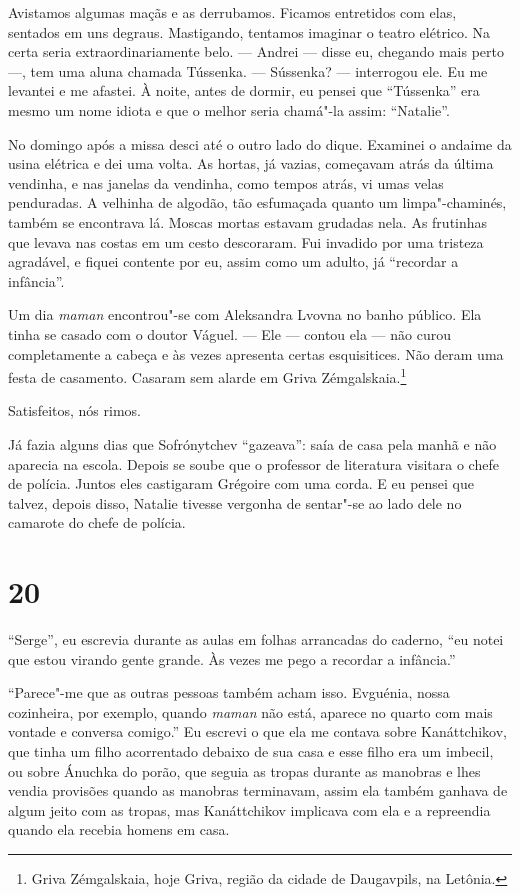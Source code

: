 Avistamos algumas maçãs e as derrubamos. Ficamos entretidos com elas,
sentados em uns degraus. Mastigando, tentamos imaginar o teatro
elétrico. Na certa seria extraordinariamente belo. --- Andrei --- disse
eu, chegando mais perto ---, tem uma aluna chamada Tússenka. ---
Sússenka? --- interrogou ele. Eu me levantei e me afastei. À noite,
antes de dormir, eu pensei que ``Tússenka'' era mesmo um nome idiota e
que o melhor seria chamá"-la assim: ``Natalie''.

No domingo após a missa desci até o outro lado do dique. Examinei o
andaime da usina elétrica e dei uma volta. As hortas, já vazias,
começavam atrás da última vendinha, e nas janelas da vendinha, como
tempos atrás, vi umas velas penduradas. A velhinha de algodão, tão %
esfumaçada quanto um limpa"-chaminés, também se encontrava lá. Moscas
mortas estavam grudadas nela. As frutinhas que levava nas costas em um
cesto descoraram. Fui invadido por uma tristeza agradável, e fiquei
contente por eu, assim como um adulto, já ``recordar a infância''.

Um dia \emph{maman} encontrou"-se com Aleksandra Lvovna no banho público.
Ela tinha se casado com o doutor Váguel. --- Ele --- contou ela --- não
curou completamente a cabeça e às vezes apresenta certas esquisitices.
Não deram uma festa de casamento. Casaram sem alarde em Griva
Zémgalskaia.\footnote{Griva Zémgalskaia, hoje Griva, região da cidade de
  Daugavpils, na Letônia.}

Satisfeitos, nós rimos.

Já fazia alguns dias que Sofrónytchev ``gazeava'': saía de casa pela
manhã e não aparecia na escola. Depois se soube que o professor de
literatura visitara o chefe de polícia. Juntos eles castigaram Grégoire
com uma corda. E eu pensei que talvez, depois disso, Natalie tivesse
vergonha de sentar"-se ao lado dele no camarote do chefe de polícia.

\section{20}

``Serge'', eu escrevia durante as aulas em folhas arrancadas do caderno,
``eu notei que estou virando gente grande. Às vezes me pego a recordar a
infância.''

``Parece"-me que as outras pessoas também acham isso. Evguénia, nossa
cozinheira, por exemplo, quando \emph{maman} não está, aparece no quarto
com mais vontade e conversa comigo.'' Eu escrevi o que ela me contava
sobre Kanáttchikov, que tinha um filho acorrentado debaixo de sua casa e
esse filho era um imbecil, ou sobre Ánuchka do porão, que seguia as
tropas durante as manobras e lhes vendia provisões quando as manobras
terminavam, assim ela também ganhava de algum jeito com as tropas, mas
Kanáttchikov implicava com ela e a repreendia quando ela recebia homens
em casa.


